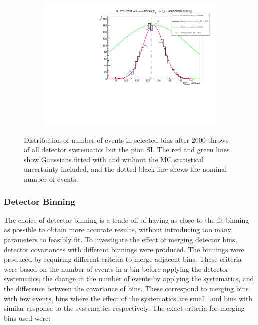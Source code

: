 \begin{figure}[h]
\begin{subfigure}{.49\textwidth}
\end{subfigure}
\begin{subfigure}{.49\textwidth}
  \centering
  \includegraphics[width=0.95\linewidth]{figs/detbin_nopisi570}
\end{subfigure}
\caption{Distribution of number of events in selected bins after 2000 throws of all detector systematics but the pion SI. The red and green lines show Gaussians fitted with and without the MC statistical uncertainty included, and the dotted black line shows the nominal number of events.}
\label{fig:detnopisibins}
\end{figure}

\subsubsection{Detector Binning}\label{sec:detbin}

The choice of detector binning is a trade-off of having as close to the fit binning as possible to obtain more accurate results, without introducing too many parameters to feasibly fit. To investigate the effect of merging detector bins, detector covariances with different binnings were produced. The binnings were produced by requiring different criteria to merge adjacent bins. These criteria were based on the number of events in a bin before applying the detector systematics, the change in the number of events by applying the systematics, and the difference between the covariance of bins. These correspond to merging bins with few events, bins where the effect of the systematics are small, and bins with similar response to the systematics respectively. The exact criteria for merging bins used were:

